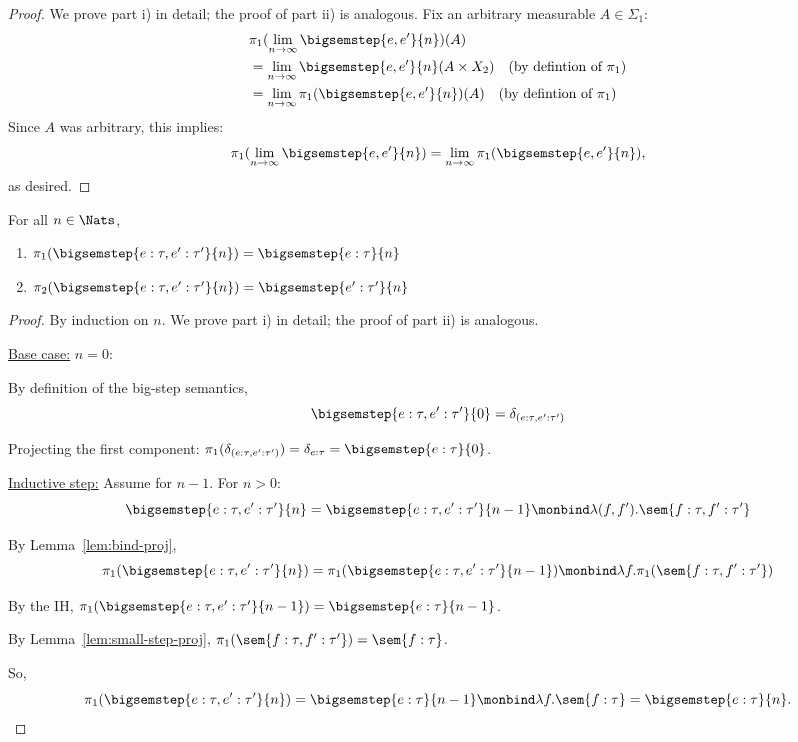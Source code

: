 \begin{proof}
	We prove part i) in detail; the proof of part ii) is analogous. Fix an arbitrary measurable $A \in \Sigma_1$:
	\begin{align*}
		&\pi_1(\lim_{n \to \infty} \bigsemstep{e,e'}{n})(A) \\
		&= \lim_{n \to \infty} \bigsemstep{e,e'}{n}(A \times X_2) \quad \text{(by defintion of $\pi_1$)}\\
		&= \lim_{n \to \infty} \pi_1(\bigsemstep{e,e'}{n})(A) \quad \text{(by defintion of $\pi_1$)}
	\end{align*}
	Since $A$ was arbitrary, this implies:
	\[
		\pi_1(\lim_{n \to \infty} \bigsemstep{e,e'}{n}) =  \lim_{n \to \infty} \pi_1(\bigsemstep{e,e'}{n}),
	\]
	as desired.
\end{proof}

\begin{lemma}
	For all $n \in \Nats$, 
	\begin{enumerate}
		\item $\pi_1(\bigsemstep{e : \tau,e' : \tau'}{n}) = \bigsemstep{e : \tau}{n}$
		\item $\pi_2(\bigsemstep{e : \tau,e' : \tau'}{n}) = \bigsemstep{e' : \tau'}{n}$
	\end{enumerate}
\end{lemma}

\begin{proof}
	By induction on $n$. We prove part i) in detail; the proof of part ii) is analogous.

	\underline{Base case:} $n=0$:

	By definition of the big-step semantics, 
	\[
		\bigsemstep{e : \tau, e' : \tau'}{0} = \delta_{(e : \tau, e' : \tau')}
	\]

	Projecting the first component: $\pi_1(\delta_{(e : \tau, e' : \tau')}) = \delta_{e : \tau} = \bigsemstep{e : \tau}{0}$.

	\underline{Inductive step:} Assume for $n-1$. For $n > 0$:
	\[
		\bigsemstep{e : \tau, e' : \tau'}{n} = \bigsemstep{e : \tau, e' : \tau'}{n-1} \monbind  \lambda (f,f'). \sem{f : \tau, f' : \tau'}
	\]

	By Lemma~\ref{lem:bind-proj},
	\[
		\pi_1(\bigsemstep{e : \tau, e' : \tau'}{n}) = \pi_1(\bigsemstep{e : \tau, e' : \tau'}{n-1}) \monbind  \lambda f. \pi_1(\sem{f : \tau, f' : \tau'})
	\]

	By the IH, $\pi_1(\bigsemstep{e : \tau, e' : \tau'}{n-1}) = \bigsemstep{e : \tau}{n-1}$.

	By Lemma~\ref{lem:small-step-proj}, $\pi_1(\sem{f : \tau, f' : \tau'}) = \sem{f : \tau}$.

	So,
	\[
		\pi_1(\bigsemstep{e : \tau, e' : \tau'}{n}) = \bigsemstep{e : \tau}{n-1} \monbind \lambda f.\sem{f : \tau} = \bigsemstep{e : \tau}{n}.
	\]
\end{proof}

